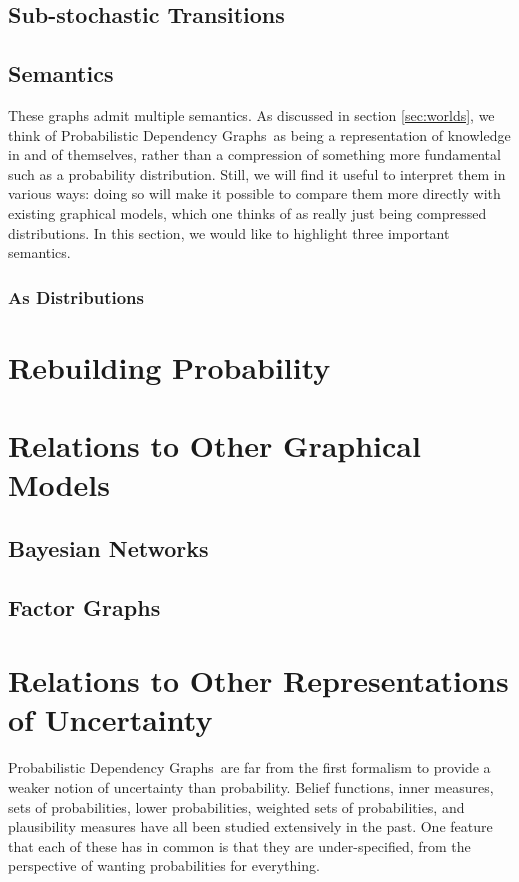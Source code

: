 \documentclass{article}
\newcommand{\modelnames}{Probabilistic Dependency Graphs}
\begin{document}
	
	\subsection{Sub-stochastic Transitions}
	
	\subsection{Semantics}
	These graphs admit multiple semantics. As discussed in section \ref{sec:worlds}, we think of \modelnames\ as being a representation of knowledge in and of themselves, rather than a compression of something more fundamental such as a probability distribution. Still, we will find it useful to interpret them in various ways: doing so will make it possible to compare them more directly with existing graphical models, which one thinks of as really just being compressed distributions. In this section, we would like to highlight three important semantics. 
	
	\subsubsection{As Distributions}
	
	\section{Rebuilding Probability}
	
	\section{Relations to Other Graphical Models}
	\subsection{Bayesian Networks}
	\subsection{Factor Graphs}
	
	\section{Relations to Other Representations of Uncertainty}
	\modelnames\ are far from the first formalism to provide a weaker notion of uncertainty than probability. Belief functions, inner measures, sets of probabilities, lower probabilities, weighted sets of probabilities, and plausibility measures have all been studied extensively in the past. One feature that each of these has in common is that they are under-specified, from the perspective of wanting probabilities for everything. 
	
\end{document}
